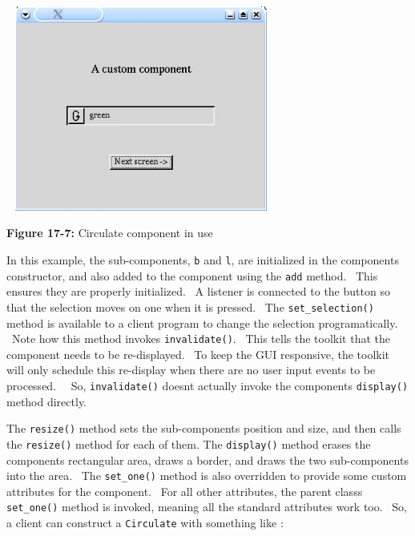 \begin{center}
\includegraphics[width=3.4992in,height=2.6543in]{ub-img/ub-img56.jpg}
\end{center}

{\sffamily\bfseries Figure 17-7:}
{\sffamily Circulate component in use}

\bigskip

In this example, the sub-components, \texttt{b} and \texttt{l}, are
initialized in the component{\textquotesingle}s constructor, and also
added to the component using the \texttt{add} method. \ This ensures
they are properly initialized. \ A listener is connected to the button
so that the selection moves on one when it is pressed. \ The
\texttt{set\_selection()} method is available to a client program to
change the selection programatically. \ Note how this method invokes
\texttt{invalidate()}. \ This tells the toolkit that the component
needs to be re-displayed. \ To keep the GUI responsive, the toolkit
will only schedule this re-display when there are no user input events
to be processed. \ \ So, \texttt{invalidate()} doesn{\textquotesingle}t
actually invoke the component{\textquotesingle}s \texttt{display()}
method directly.

The \texttt{resize()} method sets the sub-components{\textquotesingle}
position and size, and then calls the \texttt{resize()} method for each
of them. The \texttt{display()} method erases the
component{\textquotesingle}s rectangular area, draws a border, and
draws the two sub-components into the area. \ The \texttt{set\_one()}
method is also overridden to provide some custom attributes for the
component. \ For all other attributes, the parent
class{\textquotesingle}s \texttt{set\_one()} method is invoked, meaning
all the standard attributes work too. \ So, a client can construct a
\texttt{Circulate} with something like :


